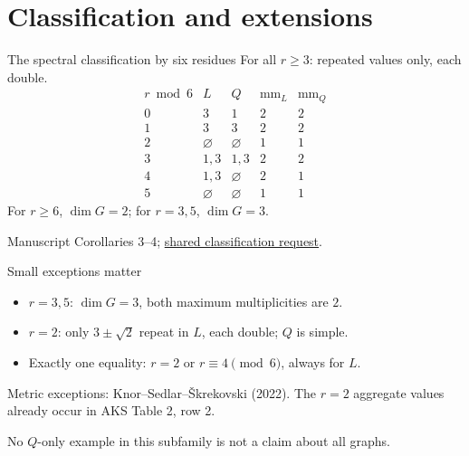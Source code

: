 \documentclass{beamer}
\begin{document}
\section{Classification and extensions}
\begin{frame}{The spectral classification by six residues}
\small For all $r\geq3$: repeated values only, each double.
\[
\begin{array}{c|cc|cc}
r\bmod6&L&Q&\operatorname{mm}_L&\operatorname{mm}_Q\\\hline
0&3&1&2&2\\1&3&3&2&2\\2&\varnothing&\varnothing&1&1\\
3&1,3&1,3&2&2\\4&1,3&\varnothing&2&1\\5&\varnothing&\varnothing&1&1
\end{array}
\]
For $r\geq6$, $\dim G=2$; for $r=3,5$, $\dim G=3$.

\small Manuscript Corollaries 3--4; \href{https://github.com/the-omega-institute/trureturing-requests/issues/40}{shared classification request}.
\end{frame}
\begin{frame}{Small exceptions matter}
\begin{itemize}
\item $r=3,5$: $\dim G=3$, both maximum multiplicities are $2$.
\item $r=2$: only $3\pm\sqrt2$ repeat in $L$, each double; $Q$ is simple.
\item Exactly one equality: $r=2$ or $r\equiv4\pmod6$, always for $L$.
\end{itemize}
\small Metric exceptions: Knor--Sedlar--Škrekovski (2022).
The $r=2$ aggregate values already occur in AKS Table 2, row 2.

No $Q$-only example in this subfamily is not a claim about all graphs.
\end{frame}
\end{document}
